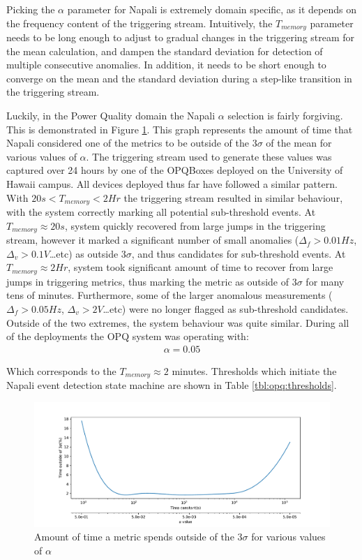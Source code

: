 Picking the $\alpha$ parameter for Napali is extremely domain specific, as it depends on the frequency content of the triggering stream.
Intuitively, the $T_{memory}$ parameter needs to be long enough to adjust to gradual changes in the triggering stream for the mean calculation,
and dampen the standard deviation for detection of multiple consecutive anomalies.
In addition, it needs to be short enough to converge on the mean and the standard deviation during a step-like transition in the triggering stream.

Luckily, in the Power Quality domain the Napali $\alpha$ selection is fairly forgiving.
This is demonstrated in Figure \ref{fig:expdes:6}.
This graph represents the amount of time that Napali considered one of the metrics to be outside of the $3\sigma$ of the mean for various values of $\alpha$.
The triggering stream used to generate these values was captured over 24 hours by one of the OPQBoxes deployed on the University of Hawaii campus.
All devices deployed thus far have followed a similar pattern.
With $20s <T_{memory} < 2Hr$ the triggering stream resulted in similar behaviour, with the system correctly marking all potential sub-threshold events.
At $T_{memory} \approx 20s$, system quickly recovered from large jumps in the triggering stream, however it marked a significant number of small anomalies ($\Delta_{f}>0.01Hz$, $\Delta_{v}> 0.1V$\ldots etc) as outside $3\sigma$, and thus candidates for sub-threshold events.
At $T_{memory} \approx 2Hr$, system took  significant amount of time to recover from large jumps in triggering metrics, thus marking the metric as outside of $3\sigma$ for many tens of minutes.
Furthermore, some of the larger anomalous measurements ($\Delta_{f}>0.05Hz$, $\Delta_{v}> 2V$\ldots etc) were no longer flagged as sub-threshold candidates.
Outside of the two extremes, the system behaviour was quite similar.
During all of the deployments the OPQ system was operating with:
\begin{equation}\label{eq:opq_alpha}
\begin{aligned}
    \alpha = 0.05
\end{aligned}
\end{equation}


Which corresponds to the $T_{memory} \approx 2$ minutes.
Thresholds which initiate the Napali event detection state machine are shown in Table \ref{tbl:opq:thresholds}.
\begin{figure}[ht!]
    \centering
    \includegraphics[width=1\linewidth]{img/napali_eval/a_selection.pdf}
    \caption{Amount of time a metric spends outside of the $3\sigma$ for various values of $\alpha$}
    \label{fig:expdes:6}
\end{figure}

